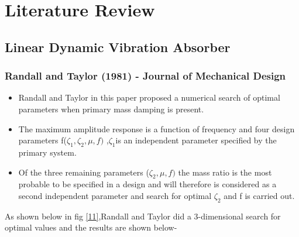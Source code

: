 %
\chapter{Literature Review}
\section{Linear Dynamic Vibration Absorber}
\subsection{Randall and Taylor (1981) - Journal of Mechanical Design}
\begin{itemize}
\item Randall and Taylor in this paper proposed a numerical search of optimal parameters when primary mass damping  is present.

\item The maximum amplitude response is a function of frequency and four design parameters f($\zeta_1, \zeta_2,\mu,f)$ ,$\zeta_1 $is an independent parameter specified by the primary system. 

\item Of the three remaining parameters ($\zeta_2,\mu,f)$ the mass ratio is the most probable to be specified in a design and will therefore is considered as a second independent parameter and search for optimal $\zeta_2 $ and f is carried out.

\end{itemize}
As shown below in fig \ref{11},Randall and Taylor did a 3-dimensional search for optimal values and the results are shown below-
